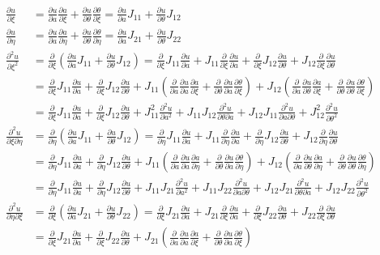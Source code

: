 \documentclass{report}
\newcommand{\pp}[2]{\frac{\partial{#1}}{\partial{#2}}}
\newcommand{\psp}[2]{\frac{\partial^2{#1}}{\partial{#2}^2}}
\newcommand{\ppp}[3]{\frac{\partial^2{#1}}{\partial{#2}\partial{#3}}}
\begin{document}
\begin{equation}
\begin{array}{ll}
\pp{u}{\xi} & = \pp{u}{a}\pp{a}{\xi} + \pp{u}{\theta}\pp{\theta}{\xi}
            = \pp{u}{a} J_{11} + \pp{u}{\theta} J_{12}
\\
\pp{u}{\eta} & = \pp{u}{a}\pp{a}{\eta} + \pp{u}{\theta}\pp{\theta}{\eta}
            = \pp{u}{a} J_{21} + \pp{u}{\theta} J_{22}
\\
\psp{u}{\xi} & = \pp{}{\xi}(\pp{u}{a} J_{11} + \pp{u}{\theta} J_{12})
             = \pp{}{\xi}J_{11}\pp{u}{a} + J_{11}\pp{}{\xi}\pp{u}{a} +
               \pp{}{\xi}J_{12}\pp{u}{\theta} + J_{12}\pp{}{\xi}\pp{u}{\theta}
\\
             & = \pp{}{\xi}J_{11}\pp{u}{a} + \pp{}{\xi}J_{12}\pp{u}{\theta}
               + J_{11}(\pp{}{a}\pp{u}{a}\pp{a}{\xi} + \pp{}{\theta}\pp{u}{a}\pp{\theta}{\xi})
               + J_{12}(\pp{}{a}\pp{u}{\theta}\pp{a}{\xi} + \pp{}{\theta}\pp{u}{\theta}\pp{\theta}{\xi})
\\
             & = \pp{}{\xi}J_{11}\pp{u}{a} + \pp{}{\xi}J_{12}\pp{u}{\theta}
               + J_{11}^2\psp{u}{a} + J_{11}J_{12}\ppp{u}{\theta}{a}
               + J_{12}J_{11}\ppp{u}{a}{\theta} + J_{12}^2\psp{u}{\theta}
\\
\ppp{u}{\xi}{\eta} & = \pp{}{\eta}(\pp{u}{a} J_{11} + \pp{u}{\theta} J_{12})
             = \pp{}{\eta}J_{11}\pp{u}{a} + J_{11}\pp{}{\eta}\pp{u}{a} +
               \pp{}{\eta}J_{12}\pp{u}{\theta} + J_{12}\pp{}{\eta}\pp{u}{\theta}
\\
             & = \pp{}{\eta}J_{11}\pp{u}{a} + \pp{}{\eta}J_{12}\pp{u}{\theta}
               + J_{11}(\pp{}{a}\pp{u}{a}\pp{a}{\eta} + \pp{}{\theta}\pp{u}{a}\pp{\theta}{\eta})
               + J_{12}(\pp{}{a}\pp{u}{\theta}\pp{a}{\eta} + \pp{}{\theta}\pp{u}{\theta}\pp{\theta}{\eta})
\\
             & = \pp{}{\eta}J_{11}\pp{u}{a} + \pp{}{\eta}J_{12}\pp{u}{\theta}
               + J_{11}J_{21}\psp{u}{a} + J_{11}J_{22}\ppp{u}{a}{\theta}
               + J_{12}J_{21}\ppp{u}{\theta}{a} + J_{12}J_{22}\psp{u}{\theta}
\\
\ppp{u}{\eta}{\xi} & = \pp{}{\xi}(\pp{u}{a} J_{21} + \pp{u}{\theta} J_{22})
                   = \pp{}{\xi}J_{21}\pp{u}{a} + J_{21}\pp{}{\xi}\pp{u}{a} +
                     \pp{}{\xi}J_{22}\pp{u}{\theta} + J_{22}\pp{}{\xi}\pp{u}{\theta}
\\
                   & = \pp{}{\xi}J_{21}\pp{u}{a} + \pp{}{\xi}J_{22}\pp{u}{\theta} 
                     + J_{21}(\pp{}{a}\pp{u}{a}\pp{a}{\xi}+\pp{}{\theta}\pp{u}{a}\pp{\theta}{\xi})

\end{array}
\end{equation}
\end{document}
